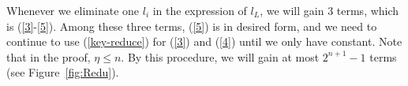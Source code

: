 	\begin{remark}
		\label{timesestimate}
		Whenever we eliminate one $l_i$ in the expression of $l_L$, we will gain 3 terms, which is (\ref{3}-\ref{5}). Among these three terms, (\ref{5}) is in desired form, and we need to continue to use (\ref{key-reduce}) for (\ref{3}) and (\ref{4}) until we only have constant. Note that in the proof, $\eta\le n$.  By this procedure, we will gain at most $2^{n+1}-1$ terms (see Figure~\ref{fig:Redu}). 
	\end{remark}